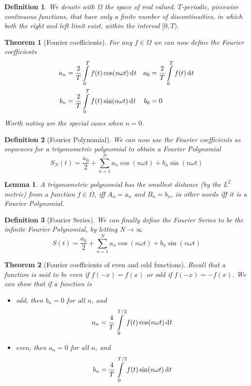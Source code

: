 \documentclass[twocolumn, margin=small]{tex/hsrzf}
\theoremstyle{komfourzf}
\newtheorem{theorem}{Theorem}
\newtheorem{definition}{Definition}
\newtheorem{lemma}{Lemma}
\begin{document}
\begin{definition}
  We denote with \(\Omega\) the space of real valued, \(T\)-periodic, piecewise continuous functions, that have only a finite number of discontinuities, in which both the right and left limit exist, within the interval \([0,T)\).
\end{definition}

\begin{theorem}[Fourier coefficients]
  For any \(f\in\Omega\) we can now define the \emph{Fourier coefficients}
  \begin{align*}
    a_n &= \frac{2}{T}\int\limits_0^T f(t)\cos(n\omega t)\,\mathrm{d}^{} t & a_0 &= \frac{2}{T}\int\limits_0^T f(t)\,\mathrm{d}^{} t \\
    b_n &= \frac{2}{T}\int\limits_0^T f(t)\sin(n\omega t)\,\mathrm{d}^{} t & b_0 &= 0
  \end{align*}
  Worth noting are the special cases when \(n=0\).
\end{theorem}

\begin{definition}[Fourier Polynomial]
  We can now use the Fourier coefficients as sequences for a trigonometric polynomial to obtain a \emph{Fourier Polynomial}
  \[
    S_N(t) = \frac{a_0}{2} + \sum_{n=1}^N a_n\cos(n\omega t) + b_n\sin(n\omega t)
  \]
\end{definition}

\begin{lemma}
  A trigonometric polynomial has the smallest distance (by the \(L^2\) metric) from a function \(f\in\Omega\), iff \(A_n = a_n\) and \(B_n = b_n\), in other words iff it is a Fourier Polynomial.
\end{lemma}

\begin{definition}[Fourier Series]
  We can finally define the \emph{Fourier Series} to be the infinite Fourier Polynomial, by letting \(N\to\infty\)
  \[
    S(t) = \frac{a_0}{2} + \sum_{n=1}^N a_n\cos(n\omega t) + b_n\sin(n\omega t)
  \]
\end{definition}

\begin{theorem}[Fourier coefficients of even and odd functions]
  Recall that a function is said to be \emph{even} if \(f(-x) = f(x)\) or \emph{odd} if \(f(-x) = -f(x)\). We can show that if a function is
  \begin{itemize}
    \item odd, then \(b_n = 0\) for all \(n\), and
      \[
        a_n = \frac{4}{T}\int\limits_0^{T/2} f(t)\cos(n\omega t)\,\mathrm{d}^{} t
      \]
    \item even, then \(a_n = 0\) for all \(n\), and
      \[
        b_n = \frac{4}{T}\int\limits_0^{T/2} f(t)\sin(n\omega t)\,\mathrm{d}^{} t
      \]
  \end{itemize}
\end{theorem}
\end{document}
